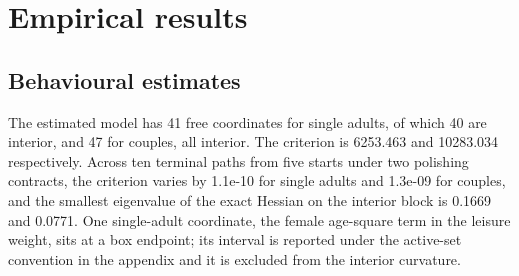 \documentclass[11pt,a4paper]{article}
\begin{document}
\section{Empirical results}\label{empirical-results}

\subsection{Behavioural estimates}\label{behavioural-estimates}

The estimated model has 41 free coordinates for single adults, of which 40 are interior, and 47 for couples, all interior. The criterion is 6253.463 and 10283.034 respectively. Across ten terminal paths from five starts under two polishing contracts, the criterion varies by 1.1e-10 for single adults and 1.3e-09 for couples, and the smallest eigenvalue of the exact Hessian on the interior block is 0.1669 and 0.0771. One single-adult coordinate, the female age-square term in the leisure weight, sits at a box endpoint; its interval is reported under the active-set convention in the appendix and it is excluded from the interior curvature.
\end{document}
